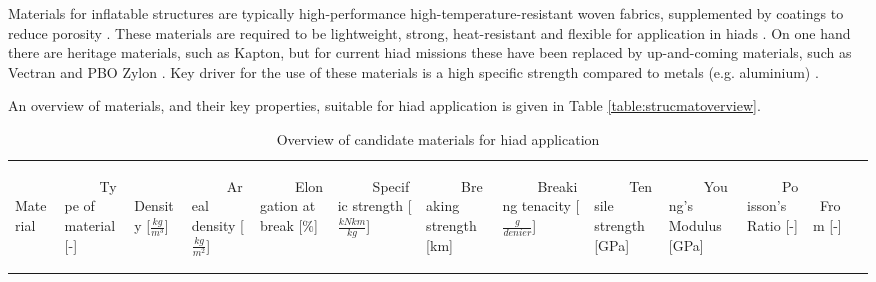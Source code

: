 Materials for inflatable structures are typically high-performance high-temperature-resistant woven fabrics, supplemented by coatings to reduce porosity \cite{Jenkins2001}. These materials are required to be lightweight, strong, heat-resistant and flexible for application in \glspl{hiad} \cite{Samareh2010}. On one hand there are heritage materials, such as Kapton, but for current \gls{hiad} missions these have been replaced by up-and-coming materials, such as Vectran and PBO Zylon \cite{Dillman2012,  Smith2010}. Key driver for the use of these materials is a high specific strength compared to metals (e.g. aluminium) \cite{Samareh2010}. 

An overview of materials, and their key properties, suitable for \gls{hiad} application is given in Table \ref{table:strucmatoverview}. 

\begin{table}[H]
\caption{Overview of candidate materials for \gls{hiad} application}
\vspace{45mm}
\hspace{-9mm}
\begin{tabular}{p{}|p{}|p{}|p{}|p{}|p{}|p{}|p{}|p{}|p{}|p{}|p{}l}
\begin{rotate}{60} ~~~~~Material \end{rotate}  &  \begin{rotate}{60} ~~~~~Type of material {[}-{]}  \end{rotate} & \begin{rotate}{60} ~~~~~Density [$\frac{kg}{m^3}$] \end{rotate}& \begin{rotate}{60} ~~~~~Areal density [$\frac{kg}{m^2}$] \end{rotate} & \begin{rotate}{60} ~~~~~Elongation at break [$\%$] \end{rotate} & \begin{rotate}{60} ~~~~~Specific strength [$\frac{kN km}{kg}$]\end{rotate} &  \begin{rotate}{60} ~~~~~Breaking strength [km]\end{rotate} & \begin{rotate}{60} ~~~~~Breaking tenacity [$\frac{g}{denier}$]\end{rotate}&  \begin{rotate}{60} ~~~~~Tensile strength [GPa] \end{rotate} & \begin{rotate}{60} ~~~~~Young's Modulus [GPa] \end{rotate} & \begin{rotate}{60} ~~~~~Poisson's Ratio [-] \end{rotate}& \begin{rotate}{60} ~~~~~From [-] \end{rotate}   \\

\end{tabular}
\end{table}
